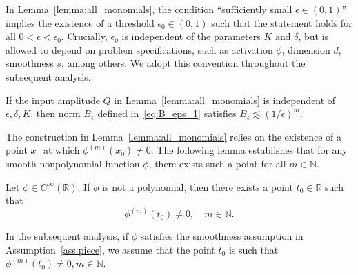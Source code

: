 \documentclass[11pt]{article}
\begin{document}
\begin{remark}
    In Lemma~\ref{lemma:all_monomials}, the condition ``sufficiently small $\epsilon \in (0,1)$'' implies the existence of a threshold $\epsilon_0 \in (0,1)$ such that the statement holds for all $0 < \epsilon < \epsilon_0$. Crucially, $\epsilon_0$ is independent of the parameters $K$ and $\delta$, but is allowed to depend on  problem specifications, such  as activation $\phi$, dimension $d$, smoothness $s$, among others.  We adopt this convention throughout the subsequent analysis.
\end{remark}

\begin{remark}
    If the input amplitude $Q$ in Lemma~\ref{lemma:all_monomials} is independent of $\epsilon, \delta, K$, then norm  $B_{\epsilon}$ defined in~\eqref{eq:B_eps_1} satisfies $B_{\epsilon} \lesssim (1 / \epsilon)^m$.
\end{remark}

The construction in Lemma~\ref{lemma:all_monomials} relies on the existence of a point $x_0$ at which $\phi^{(m)}(x_0) \neq 0$. The following lemma establishes that for any smooth nonpolynomial function $\phi$, there exists such a point for all $m \in \mathbb{N}$.

\begin{lemma}
\label{lemma:nonpoly_derivative_nonzero}
    Let $\phi \in C^{\infty}(\mathbb{R})$. 
    If $\phi$ is not a polynomial, then there exists a point $t_0 \in \mathbb{R}$ such that
    \[
        \phi^{(m)}(t_0) \neq 0, \quad m \in \mathbb{N}.
    \]
\end{lemma}
In the subsequent analysis, if $\phi$ satisfies the smoothness assumption in Assumption~\ref{ass:piece}, we assume that the point $t_0$ is such that $\phi^{(m)}(t_0) \neq 0, m\in \mathbb{N}$.
\end{document}
